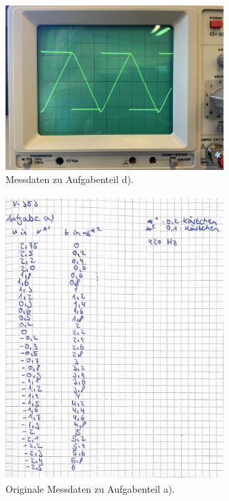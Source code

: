 \begin{figure}
    \centering
    \includegraphics[width=0.75\textwidth]{Dateien/d.3.jpeg}
    \caption{Messdaten zu Aufgabenteil d).}
    \label{fig:d.3}
\end{figure}


\begin{figure}
    \centering
    \includegraphics[width=0.75\textwidth]{Dateien/daten1.jpg}
    \caption{Originale Messdaten zu Aufgabenteil a).}
    \label{fig:daten1}
\end{figure}

